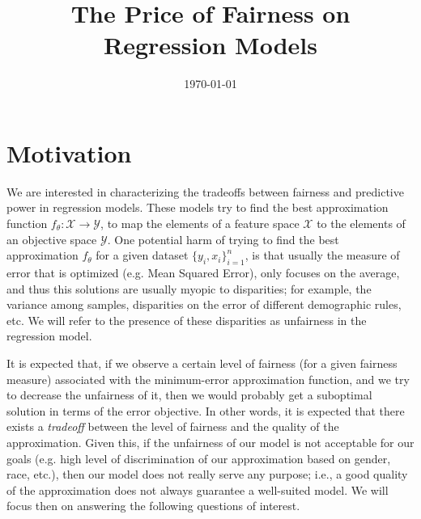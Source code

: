 \documentclass[11pt]{article}
\title{The Price of Fairness on Regression Models}
\date{\today}
\theoremstyle{plain}
\theoremstyle{definition}
\newcommand{\1}{\mathbf{1}}
\newcommand{\Y}{\mathcal{Y}}
\newcommand{\X}{\mathcal{X}}
\begin{document}
\maketitle



\section*{Motivation}

\indent We are interested in characterizing the tradeoffs between fairness and predictive power in regression models. These models try to find the best approximation function $f_\theta:\X \rightarrow \Y$, to map the elements of a feature space $\X$ to the elements of an objective space $\Y$. One potential harm of trying to find the best approximation $f_\theta$ for a given dataset $\{y_i, x_i\}_{i=1}^n$, is that usually the measure of error that is optimized (e.g. Mean Squared Error), only focuses on the average, and thus this solutions are usually myopic to disparities; for example, the variance among samples, disparities on the error of different demographic rules, etc. We will refer to the presence of these disparities as unfairness in the regression model. 

It is expected that, if we observe a certain level of fairness (for a given fairness measure) associated with the minimum-error approximation function, and we try to decrease the unfairness of it, then we would probably get a suboptimal solution in terms of the error objective. In other words, it is expected that there exists a \textit{tradeoff} between the level of fairness and the quality of the approximation. Given this, if the unfairness of our model is not acceptable for our goals (e.g. high level of discrimination of our approximation based on gender, race, etc.), then our model does not really serve any purpose; i.e., a good quality of the approximation does not always guarantee a well-suited model. We will focus then on answering the following questions of interest.  
\end{document}
